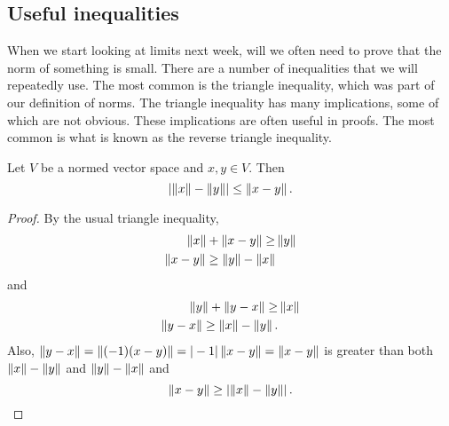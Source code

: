 \subsection{Useful inequalities}
When we start looking at limits next week, will we often need to prove
that the norm of something is small. There are a number of
inequalities that we will repeatedly use. The most common is the
triangle inequality, which was part of our definition of norms.  The
triangle inequality has many implications, some of which are not
obvious. These implications are often useful in proofs. The most
common is what is known as the reverse triangle inequality.
\begin{theorem}
  Let $V$ be a normed vector space and $x,y \in V$. Then
  \[ \left| \left\Vert {x} \right\Vert - \left\Vert {y} \right\Vert \right| \leq \left\Vert {x-y} \right\Vert. \]
\end{theorem}
\begin{proof}
  By the usual triangle inequality,
  \begin{align*}
    \left\Vert {x} \right\Vert + \left\Vert {x-y} \right\Vert \geq & \left\Vert {y} \right\Vert \\
    \left\Vert {x-y} \right\Vert \geq \left\Vert {y} \right\Vert - \left\Vert {x} \right\Vert
  \end{align*}
  and
  \begin{align*}
    \left\Vert {y} \right\Vert + \left\Vert {y-x} \right\Vert \geq & \left\Vert {x} \right\Vert \\
    \left\Vert {y-x} \right\Vert \geq \left\Vert {x} \right\Vert - \left\Vert {y} \right\Vert.
  \end{align*}
  Also, $\left\Vert {y-x} \right\Vert = \left\Vert {(-1)(x-y)} \right\Vert = |-1| \left\Vert {x-y} \right\Vert =
  \left\Vert {x-y} \right\Vert$ is greater than both $\left\Vert {x} \right\Vert-\left\Vert {y} \right\Vert$ and
  $\left\Vert {y} \right\Vert-\left\Vert {x} \right\Vert$ and 
  \[ \left\Vert {x-y} \right\Vert \geq \left| \left\Vert {x} \right\Vert - \left\Vert {y} \right\Vert \right|. \]
\end{proof}

